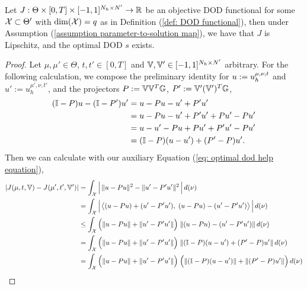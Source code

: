 \begin{lemma} \label{lemma: DOD functional is lipschitz}
    Let $J: \Theta \times [0, T] \times [-1, 1]^{N_h \times N'} \to \mathbb{R}$ be an objective DOD functional
    for some $\mathcal{X} \subset \Theta'$ with $\text{dim}(\mathcal{X}) = q$ as in 
    Definition (\ref{def: DOD functional}),
    then under Assumption (\ref{assumption parameter-to-solution map}), we have that $J$ is Lipschitz,
    and the optimal DOD $s$ exists.
\end{lemma}
\begin{proof}
    Let $\mu, \mu' \in \Theta$, $t, t' \in [0, T]$ 
    and $\mathbb{V}, \mathbb{V}' \in [-1, 1]^{N_h \times N'}$ arbitrary.
    For the following calculation, we compose the preliminary identity for 
    $u := u_h^{\mu, \nu, t}$ and $u' := u_h^{\mu', \nu, t'}$,
    and the projectors $P := \mathbb{V} \mathbb{V}^T \mathbb{G}$, $P' := \mathbb{V}' (\mathbb{V}')^T \mathbb{G}$,
    \begin{equation} \label{eq: optimal dod help equation}
        \begin{aligned}
            (\mathbb{I} - P)u - (\mathbb{I} - P')u' &= u - Pu - u' + P'u' \\
            &= u - Pu - u' + P'u' + Pu' - Pu' \\
            &= u - u' - Pu + Pu' + P'u' - Pu' \\
            &= (\mathbb{I} - P)(u - u') + (P' - P)u'.
        \end{aligned}
    \end{equation}
    Then we can calculate with our auxiliary 
    Equation (\ref{eq: optimal dod help equation}),
    \begin{align*}
        \euknorm{J(\mu, t, \V) - J(\mu', t', \V')}
        &= \int_{\Xcal} 
           \Big| \, \norm{u - P u}^2 - \norm{u' - P' u'}^2 \, \Big| \, d(\nu)
           \\
        &= \int_{\Xcal}
           \Big| \, \big\langle (u - Pu) + (u' - P'u'),\; (u - Pu) - (u' - P'u') \big\rangle \, \Big| \, d(\nu)
           \\
        &\leq \int_{\Xcal}
           \Big( \norm{u - Pu} + \norm{u' - P'u'} \Big)\;
           \norm{ (u - Pu) - (u' - P'u') } \, d(\nu)
           \\
        &= \int_{\Xcal}
           \Big( \norm{u - Pu} + \norm{u' - P'u'} \Big)\;
           \norm{ (\I - P)(u - u') + (P' - P)u' } \, d(\nu)
           \\
        &= \int_{\Xcal}
           \Big( \norm{u - Pu} + \norm{u' - P'u'} \Big)\;
           \Big( \norm{(\I - P)(u - u')} + \norm{(P' - P)u'} \Big) \, d(\nu)
           \\

\end{align*}
\end{proof}
